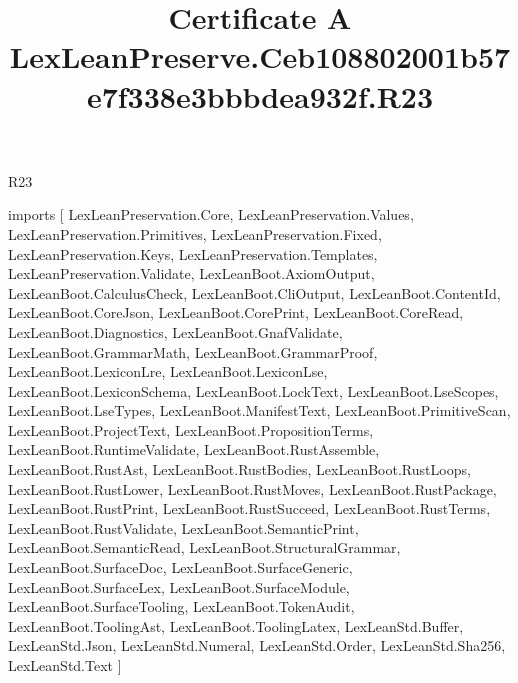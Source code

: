 \begin{lexlean}{R23}
\title{Certificate A LexLeanPreserve.Ceb108802001b57e7f338e3bbbdea932f.R23}
\begin{coremodule}
imports [
  LexLeanPreservation.Core,
  LexLeanPreservation.Values,
  LexLeanPreservation.Primitives,
  LexLeanPreservation.Fixed,
  LexLeanPreservation.Keys,
  LexLeanPreservation.Templates,
  LexLeanPreservation.Validate,
  LexLeanBoot.AxiomOutput,
  LexLeanBoot.CalculusCheck,
  LexLeanBoot.CliOutput,
  LexLeanBoot.ContentId,
  LexLeanBoot.CoreJson,
  LexLeanBoot.CorePrint,
  LexLeanBoot.CoreRead,
  LexLeanBoot.Diagnostics,
  LexLeanBoot.GnafValidate,
  LexLeanBoot.GrammarMath,
  LexLeanBoot.GrammarProof,
  LexLeanBoot.LexiconLre,
  LexLeanBoot.LexiconLse,
  LexLeanBoot.LexiconSchema,
  LexLeanBoot.LockText,
  LexLeanBoot.LseScopes,
  LexLeanBoot.LseTypes,
  LexLeanBoot.ManifestText,
  LexLeanBoot.PrimitiveScan,
  LexLeanBoot.ProjectText,
  LexLeanBoot.PropositionTerms,
  LexLeanBoot.RuntimeValidate,
  LexLeanBoot.RustAssemble,
  LexLeanBoot.RustAst,
  LexLeanBoot.RustBodies,
  LexLeanBoot.RustLoops,
  LexLeanBoot.RustLower,
  LexLeanBoot.RustMoves,
  LexLeanBoot.RustPackage,
  LexLeanBoot.RustPrint,
  LexLeanBoot.RustSucceed,
  LexLeanBoot.RustTerms,
  LexLeanBoot.RustValidate,
  LexLeanBoot.SemanticPrint,
  LexLeanBoot.SemanticRead,
  LexLeanBoot.StructuralGrammar,
  LexLeanBoot.SurfaceDoc,
  LexLeanBoot.SurfaceGeneric,
  LexLeanBoot.SurfaceLex,
  LexLeanBoot.SurfaceModule,
  LexLeanBoot.SurfaceTooling,
  LexLeanBoot.TokenAudit,
  LexLeanBoot.ToolingAst,
  LexLeanBoot.ToolingLatex,
  LexLeanStd.Buffer,
  LexLeanStd.Json,
  LexLeanStd.Numeral,
  LexLeanStd.Order,
  LexLeanStd.Sha256,
  LexLeanStd.Text
]


\end{coremodule}
\end{lexlean}
